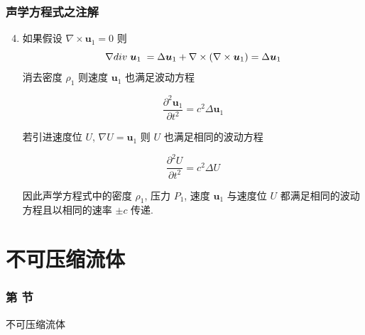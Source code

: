 \documentclass[aspectratio=2516]{beamer}
\begin{document}
\begin{frame}
\frametitle{\kaishu 声学方程式之注解}

\kaishu 

\begin{enumerate}
	
	\setcounter{enumi}{3}

	\item 如果假设 $\nabla  \times {\boldsymbol{u}_1} = 0$ 则
	\begin{equation}
	\nabla div\;{\boldsymbol{u}_1}\; = \Delta {\boldsymbol{u}_1} + \nabla  \times \left( {\nabla  \times {\boldsymbol{u}_1}} \right) = \Delta {\boldsymbol{u}_1}
	\notag 
	\end{equation}
	消去密度 $ \rho_1 $ 则速度 $ \boldsymbol{u}_{1} $ 也满足波动方程
	
	\begin{equation}
	\frac{{{\partial ^2}{\boldsymbol{u}_1}}}{{\partial {t^2}}} = {c^2}\Delta {\boldsymbol{u}_1}
	\label{eq5.1.30}
	\end{equation}
	
	若引进速度位 $ U $, $\nabla U = {\boldsymbol{u}_1}$ 则 $ U $ 也满足相同的波动方程
	
	\begin{equation}
	\frac{{{\partial ^2}U}}{{\partial {t^2}}} = {c^2}\Delta U
	\label{eq5.1.31}
	\end{equation}
	
	因此声学方程式中的密度 $ \rho_1 $, 压力 $ P_{1} $, 速度 $ \boldsymbol{u}_{1} $ 与速度位 $ U $ 都满足相同的波动方程且以相同的速率 $ \pm c$ 传递.
\end{enumerate}

\end{frame}




\section{\kaishu  不可压缩流体}


\begin{frame}
\frametitle{ \kaishu 第 \uppercase\expandafter{} 节}
\begin{center}
	\Large \kaishu  不可压缩流体
\end{center}
\end{frame}
\end{document}
